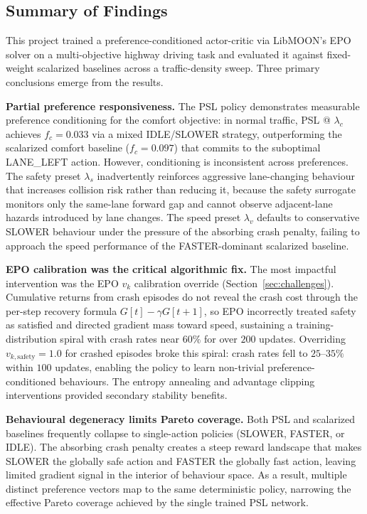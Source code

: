 \documentclass[12pt, letterpaper]{article}
\begin{document}
\subsection{Summary of Findings}

This project trained a preference-conditioned actor-critic via LibMOON's EPO solver on a multi-objective highway driving task and evaluated it against fixed-weight scalarized baselines across a traffic-density sweep.
Three primary conclusions emerge from the results.

\textbf{Partial preference responsiveness.}
The PSL policy demonstrates measurable preference conditioning for the comfort objective: in normal traffic, PSL @ $\lambda_c$ achieves $f_c = 0.033$ via a mixed IDLE/SLOWER strategy, outperforming the scalarized comfort baseline ($f_c = 0.097$) that commits to the suboptimal LANE\_LEFT action.
However, conditioning is inconsistent across preferences.
The safety preset $\lambda_s$ inadvertently reinforces aggressive lane-changing behaviour that increases collision risk rather than reducing it, because the safety surrogate monitors only the same-lane forward gap and cannot observe adjacent-lane hazards introduced by lane changes.
The speed preset $\lambda_v$ defaults to conservative SLOWER behaviour under the pressure of the absorbing crash penalty, failing to approach the speed performance of the FASTER-dominant scalarized baseline.

\textbf{EPO calibration was the critical algorithmic fix.}
The most impactful intervention was the EPO $v_k$ calibration override (Section~\ref{sec:challenges}).
Cumulative returns from crash episodes do not reveal the crash cost through the per-step recovery formula $G[t]-\gamma G[t+1]$, so EPO incorrectly treated safety as satisfied and directed gradient mass toward speed, sustaining a training-distribution spiral with crash rates near $60\%$ for over $200$ updates.
Overriding $v_{k,\text{safety}}=1.0$ for crashed episodes broke this spiral: crash rates fell to $25$--$35\%$ within $100$ updates, enabling the policy to learn non-trivial preference-conditioned behaviours.
The entropy annealing and advantage clipping interventions provided secondary stability benefits.

\textbf{Behavioural degeneracy limits Pareto coverage.}
Both PSL and scalarized baselines frequently collapse to single-action policies (SLOWER, FASTER, or IDLE).
The absorbing crash penalty creates a steep reward landscape that makes SLOWER the globally safe action and FASTER the globally fast action, leaving limited gradient signal in the interior of behaviour space.
As a result, multiple distinct preference vectors map to the same deterministic policy, narrowing the effective Pareto coverage achieved by the single trained PSL network.
\end{document}
